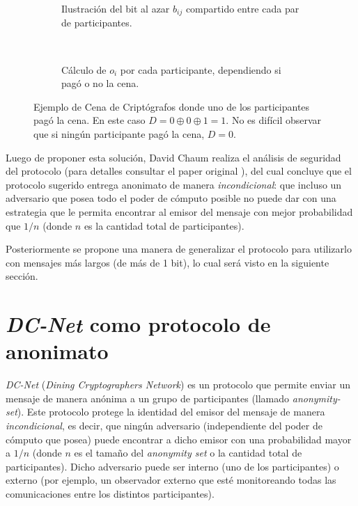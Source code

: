 \begin{figure}[H]
\centering
\begin{subfigure}[b]{0.4\textwidth}
    
    \caption{Ilustración del bit al azar $b_{ij}$ compartido entre cada par de 
    participantes.}
    \label{2a}
\end{subfigure}
~
\begin{subfigure}[b]{0.4\textwidth}
    
    \caption{Cálculo de $o_i$ por cada participante, dependiendo si pagó o no 
    la cena.}
    \label{2b}
\end{subfigure}

\protect\caption{Ejemplo de Cena de Criptógrafos donde uno de los 
participantes pagó la cena. En este caso $D = 0 \oplus 0 \oplus 1 = 1$. 
No es difícil observar que si ningún participante pagó la cena, $D = 0$.}
\label{fig:example_dcnet_chaum}
\end{figure}

Luego de proponer esta solución, David Chaum realiza el análisis de seguridad 
del protocolo (para detalles consultar el paper original 
\cite{chaum1988dining}), del cual concluye que el protocolo sugerido entrega 
anonimato de manera \emph{incondicional}: que incluso un adversario que posea 
todo el poder de cómputo posible no puede dar con una estrategia que le 
permita encontrar al emisor del mensaje con mejor probabilidad que $1/n$ 
(donde $n$ es la cantidad total de participantes).

Posteriormente se propone una manera de generalizar el protocolo para 
utilizarlo con mensajes más largos (de más de 1 bit), lo cual será 
visto en la siguiente sección.

\section{\emph{DC-Net} como protocolo de anonimato}

\emph{DC-Net} (\emph{Dining Cryptographers Network}) es un protocolo que 
permite enviar un mensaje de manera anónima a un grupo de participantes 
(llamado \emph{anonymity-set}). Este protocolo protege la identidad del emisor 
del mensaje de manera \emph{incondicional}, es decir, que ningún adversario 
(independiente del poder de cómputo que posea) puede encontrar a dicho emisor 
con una probabilidad mayor a $1/n$ (donde $n$ es el tamaño del 
\emph{anonymity set} o la cantidad total de participantes). Dicho adversario 
puede ser interno (uno de los participantes) o externo (por ejemplo, un 
observador externo que esté monitoreando todas las comunicaciones entre los 
distintos participantes).

